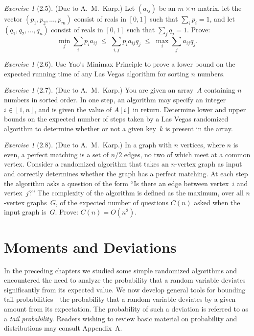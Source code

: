 \documentclass[twoside,12pt]{book}
\theoremstyle{plain}
\theoremstyle{definition}
\theoremstyle{remark}
\newtheorem{exercise}[theorem]{Exercise}
\begin{document}
\begin{exercise}[2.5]
(Due to A.~M.~Karp.)  Let $(a_{ij})$ be an $m\times n$ matrix, let the
vector $(p_1,p_2,\ldots,p_m)$ consist of reals in $[0,1]$ such that
$\sum_i p_i=1$, and let $(q_1,q_2,\ldots,q_n)$ consist of reals in $[0,1]$
such that $\sum_j q_j=1$.  Prove:
\[
  \min_j \sum_i p_i a_{ij}
  \;\le\; \sum_{i,j} p_i a_{ij} q_j
  \;\le\; \max_i \sum_j a_{ij} q_j.
\]
\end{exercise}

\begin{exercise}[2.6]
Use Yao's Minimax Principle to prove a lower bound on the expected running
time of any Las Vegas algorithm for sorting $n$ numbers.
\end{exercise}

\begin{exercise}[2.7]
(Due to A.~M.~Karp.)  You are given an array~$A$ containing $n$ numbers in
sorted order.  In one step, an algorithm may specify an integer $i\in[1,n]$,
and is given the value of $A[i]$ in return.  Determine lower and upper bounds
on the expected number of steps taken by a Las Vegas randomized algorithm to
determine whether or not a given key~$k$ is present in the array.
\end{exercise}

\begin{exercise}[2.8]
(Due to A.~M.~Karp.)  In a graph with $n$ vertices, where $n$ is even, a
perfect matching is a set of $n/2$ edges, no two of which meet at a common
vertex.  Consider a randomized algorithm that takes an $n$-vertex graph as
input and correctly determines whether the graph has a perfect matching.  At
each step the algorithm asks a question of the form ``Is there an edge between
vertex~$i$ and vertex~$j$?''  The complexity of the algorithm is defined as
the maximum, over all $n$-vertex graphs~$G$, of the expected number of
questions $C(n)$ asked when the input graph is~$G$.  Prove: $C(n)=O(n^2)$.
\end{exercise}


\chapter{Moments and Deviations}
\label{ch:moments}

In the preceding chapters we studied some simple randomized algorithms and encountered the need to analyze the probability that a random variable deviates significantly from its expected value. We now develop general tools for bounding tail probabilities---the probability that a random variable deviates by a given amount from its expectation. The probability of such a deviation is referred to as a \emph{tail probability}. Readers wishing to review basic material on probability and distributions may consult Appendix~A.
\end{document}
